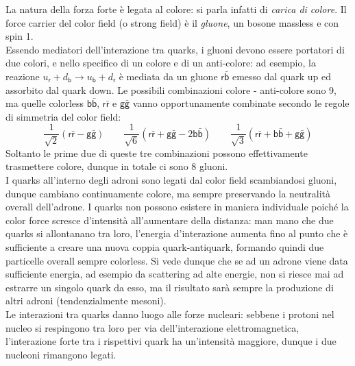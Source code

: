 La natura della forza forte è legata al colore: si parla infatti di \textit{carica di colore}. Il force carrier del color field (o strong field) è il \textit{gluone}, un bosone massless e con spin 1.\\
Essendo mediatori dell'interazione tra quarks, i gluoni devono essere portatori di due colori, e nello specifico di un colore e di un anti-colore: ad esempio, la reazione $ u_{\mathsf{r}} + d_{\mathsf{b}} \rightarrow u_{\mathsf{b}} + d_{\mathsf{r}} $ è mediata da un gluone $ \mathsf{r}\bar{\mathsf{b}} $ emesso dal quark up ed assorbito dal quark down. Le possibili combinazioni colore - anti-colore sono 9, ma quelle colorless $ \mathsf{b}\bar{\mathsf{b}} $, $ \mathsf{r}\bar{\mathsf{r}} $ e $ \mathsf{g}\bar{\mathsf{g}} $ vanno opportunamente combinate secondo le regole di simmetria del color field:
\begin{equation*}
	\frac{1}{\sqrt{2}} \left( \mathsf{r}\bar{\mathsf{r}} - \mathsf{g}\bar{\mathsf{g}} \right)
	\qquad
	\frac{1}{\sqrt{6}} \left( \mathsf{r}\bar{\mathsf{r}} + \mathsf{g}\bar{\mathsf{g}} - 2\mathsf{b}\bar{\mathsf{b}} \right)
	\qquad
	\frac{1}{\sqrt{3}} \left( \mathsf{r}\bar{\mathsf{r}} + \mathsf{b}\bar{\mathsf{b}} + \mathsf{g}\bar{\mathsf{g}} \right)
\end{equation*}
Soltanto le prime due di queste tre combinazioni possono effettivamente trasmettere colore, dunque in totale ci sono 8 gluoni.\\
I quarks all'interno degli adroni sono legati dal color field scambiandosi gluoni, dunque cambiano continuamente colore, ma sempre preservando la neutralità overall dell'adrone. I quarks non possono esistere in maniera individuale poiché la color force scresce d'intensità all'aumentare della distanza: man mano che due quarks si allontanano tra loro, l'energia d'interazione aumenta fino al punto che è sufficiente a creare una nuova coppia quark-antiquark, formando quindi due particelle overall sempre colorless. Si vede dunque che se ad un adrone viene data sufficiente energia, ad esempio da scattering ad alte energie, non si riesce mai ad estrarre un singolo quark da esso, ma il risultato sarà sempre la produzione di altri adroni (tendenzialmente mesoni).\\
Le interazioni tra quarks danno luogo alle forze nucleari: sebbene i protoni nel nucleo si respingono tra loro per via dell'interazione elettromagnetica, l'interazione forte tra i rispettivi quark ha un'intensità maggiore, dunque i due nucleoni rimangono legati.












